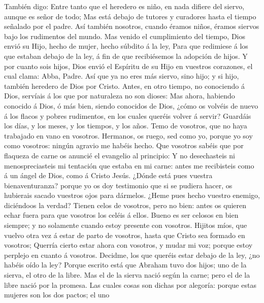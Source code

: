  También digo: Entre tanto que el heredero es niño, en nada
difiere del siervo, aunque es señor de todo;  Mas está
debajo de tutores y curadores hasta el tiempo señalado por el padre.
 Así también nosotros, cuando éramos niños, éramos siervos
bajo los rudimentos del mundo.  Mas venido el cumplimiento
del tiempo, Dios envió su Hijo, hecho de mujer, hecho súbdito á la ley,
 Para que redimiese á los que estaban debajo de la ley, á
fin de que recibiésemos la adopción de hijos.  Y por cuanto
sois hijos, Dios envió el Espíritu de su Hijo en vuestros corazones, el
cual clama: Abba, Padre.  Así que ya no eres más siervo,
sino hijo; y si hijo, también heredero de Dios por Cristo. 
Antes, en otro tiempo, no conociendo á Dios, servíais á los que por
naturaleza no son dioses:  Mas ahora, habiendo conocido á
Dios, ó más bien, siendo conocidos de Dios, ¿cómo os volvéis de nuevo á
los flacos y pobres rudimentos, en los cuales queréis volver á servir?
 Guardáis los días, y los meses, y los tiempos, y los años.
 Temo de vosotros, que no haya trabajado en vano en
vosotros.  Hermanos, os ruego, sed como yo, porque yo soy
como vosotros: ningún agravio me habéis hecho.  Que
vosotros sabéis que por flaqueza de carne os anuncié el evangelio al
principio:  Y no desechasteis ni menospreciasteis mi
tentación que estaba en mi carne: antes me recibisteis como á un ángel
de Dios, como á Cristo Jesús.  ¿Dónde está pues vuestra
bienaventuranza? porque yo os doy testimonio que si se pudiera hacer, os
hubierais sacado vuestros ojos para dármelos.  ¿Heme pues
hecho vuestro enemigo, diciéndoos la verdad?  Tienen celos
de vosotros, pero no bien: antes os quieren echar fuera para que
vosotros los celéis á ellos.  Bueno es ser celosos en bien
siempre; y no solamente cuando estoy presente con vosotros.
 Hijitos míos, que vuelvo otra vez á estar de parto de
vosotros, hasta que Cristo sea formado en vosotros; 
Querría cierto estar ahora con vosotros, y mudar mi voz; porque estoy
perplejo en cuanto á vosotros.  Decidme, los que queréis
estar debajo de la ley, ¿no habéis oído la ley?  Porque
escrito está que Abraham tuvo dos hijos; uno de la sierva, el otro de la
libre.  Mas el de la sierva nació según la carne; pero el
de la libre nació por la promesa.  Las cuales cosas son
dichas por alegoría: porque estas mujeres son los dos pactos; el uno
